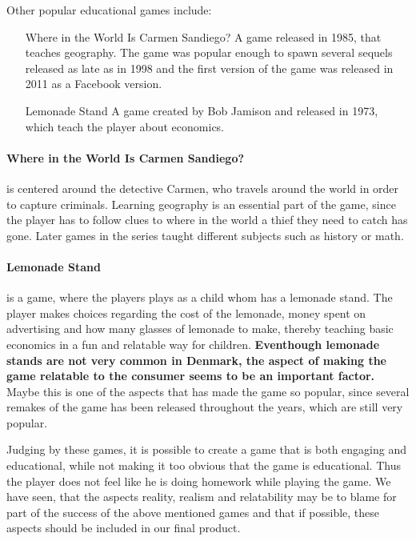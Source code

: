 Other popular educational games include:
\begin{itemize}
	\item[Where in the World Is Carmen Sandiego?] A game released in 1985, that teaches geography. The game was popular enough to spawn several sequels released as late as in 1998 and the first version of the game was released in 2011 as a Facebook version.\cite{carmensandiego}
	\item[Lemonade Stand] A game created by Bob Jamison and released in 1973, which teach the player about economics.\cite{lemonadestand}
\end{itemize}

\paragraph{Where in the World Is Carmen Sandiego?} is centered around the detective Carmen, who travels around the world in order to capture criminals. Learning geography is an essential part of the game, since the player has to follow clues to where in the world a thief they need to catch has gone. Later games in the series taught different subjects such as history or math.

\paragraph{Lemonade Stand} is a game, where the players plays as a child whom has a lemonade stand.
The player makes choices regarding the cost of the lemonade, money spent on advertising and how many glasses of lemonade to make, thereby teaching basic economics in a fun and relatable way for children. \textbf{Eventhough lemonade stands are not very common in Denmark, the aspect of making the game relatable to the consumer seems to be an important factor.} Maybe this is one of the aspects that has made the game so popular, since several remakes of the game has been released throughout the years, which are still very popular.\newline

Judging by these games, it is possible to create a game that is both engaging and educational, while not making it too obvious that the game is educational. Thus the player does not feel like he is doing homework while playing the game. We have seen, that the aspects reality, realism and relatability may be to blame for part of the success of the above mentioned games and that if possible, these aspects should be included in our final product.

